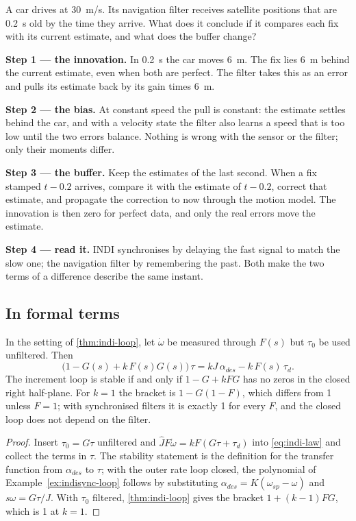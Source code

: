\begin{example}
\label{ex:indisync-gnss}
A car drives at \SI{30}{m/s}. Its navigation filter receives satellite positions that are \SI{0.2}{s} old by the time they arrive. What does it conclude if it compares each fix with its current estimate, and what does the buffer change?

\textbf{Step 1 — the innovation.} In \SI{0.2}{s} the car moves \SI{6}{m}. The fix lies \SI{6}{m} behind the current estimate, even when both are perfect. The filter takes this as an error and pulls its estimate back by its gain times \SI{6}{m}.

\textbf{Step 2 — the bias.} At constant speed the pull is constant: the estimate settles behind the car, and with a velocity state the filter also learns a speed that is too low until the two errors balance. Nothing is wrong with the sensor or the filter; only their moments differ.

\textbf{Step 3 — the buffer.} Keep the estimates of the last second. When a fix stamped $t - 0.2$ arrives, compare it with the estimate of $t - 0.2$, correct that estimate, and propagate the correction to now through the motion model. The innovation is then zero for perfect data, and only the real errors move the estimate.

\textbf{Step 4 — read it.} INDI synchronises by delaying the fast signal to match the slow one; the navigation filter by remembering the past. Both make the two terms of a difference describe the same instant.
\end{example}

\subsection{In formal terms}

\begin{theorem}
\label{thm:indisync-loop}
In the setting of \cref{thm:indi-loop}, let $\dot\omega$ be measured through $F(s)$ but $\tau_0$ be used unfiltered. Then
\begin{equation*}
  \big(1 - G(s) + k\,F(s)G(s)\big)\,\tau = kJ\,\alpha_{des} - k\,F(s)\,\tau_d .
\end{equation*}
The increment loop is stable if and only if $1 - G + kFG$ has no zeros in the closed right half-plane. For $k = 1$ the bracket is $1 - G(1 - F)$, which differs from 1 unless $F = 1$; with synchronised filters it is exactly 1 for every $F$, and the closed loop does not depend on the filter.
\end{theorem}
\begin{proof}
Insert $\tau_0 = G\tau$ unfiltered and $\hat J F\dot\omega = kF(G\tau + \tau_d)$ into \cref{eq:indi-law} and collect the terms in $\tau$. The stability statement is the definition for the transfer function from $\alpha_{des}$ to $\tau$; with the outer rate loop closed, the polynomial of Example~\ref{ex:indisync-loop} follows by substituting $\alpha_{des} = K(\omega_{sp} - \omega)$ and $s\omega = G\tau/J$. With $\tau_0$ filtered, \cref{thm:indi-loop} gives the bracket $1 + (k - 1)FG$, which is 1 at $k = 1$.
\end{proof}


